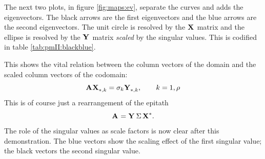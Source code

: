The next two plots, in figure \eqref{fig:maps:ev}, separate the curves and adds the eigenvectors. The black arrows are the first eigenvectors and the blue arrows are the second eigenvectors. The unit circle is resolved by the $\textbf{X}^{\mathrm{}}$ matrix and the ellipse is resolved by the $\textbf{Y}^{\mathrm{}}$ matrix \textit{scaled} by the singular values. This is codified in table \eqref{tab:pmII:blackblue}.

\begin{table}[htdp]
\begin{center}
\end{center}
\label{tab:pmII:blackblue}
\caption{The eigenvectors of the domain and codomain and the scaling action of the eigenvectors.}
\end{table}%

This shows the vital relation between the column vectors of the domain and the scaled column vectors of the codomain:
\begin{equation}
  \textbf{A}^{\mathrm{}} \textbf{X}^{\mathrm{}}_{*,k} = \sigma_{k}\textbf{Y}^{\mathrm{}}_{*,k}, \qquad k=1,\rho
  \label{eq:pmII:vital}
\end{equation}
This is of course just a rearrangement of the epitath
$$
\textbf{A}^{\mathrm{}} = \textbf{Y}^{\mathrm{}}\, \Sigma \, \textbf{X}^{\mathrm{ \mathrm{*} }}.
$$
The role of the singular values as scale factors is now clear after this demonstration. The blue vectors show the scaling effect of the first singular value; the black vectors the second singular value.

